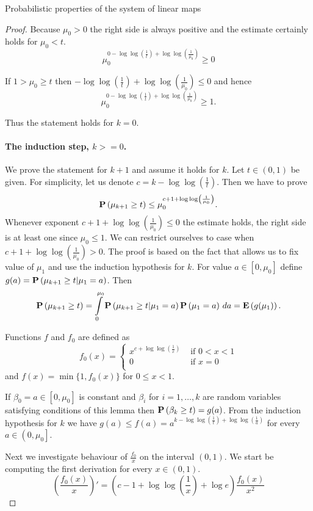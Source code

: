 \begin{section}{Probabilistic properties of the system of linear maps}
\begin{proof}
Because $\mu_0 > 0$ the right side is always positive and the estimate certainly holds for $\mu_0 < t$.
\[
	\mu_0^{0 - \log \log \left(\frac{1}{t}\right) + \log \log \left(\frac{1}{\mu_0}\right)} \geq 0
\]

If $1 > \mu_0 \geq t$ then $-\log \log \left(\frac{1}{t}\right) + \log \log \left(\frac{1}{\mu_0}\right) \leq 0$ and hence
\[
	\mu_0^{0 - \log \log \left(\frac{1}{t}\right) + \log \log \left(\frac{1}{\mu_0}\right)} \geq 1 \text{.}
\]

Thus the statement holds for $k = 0$.

\paragraph*{The induction step, $k >= 0$.} We prove the statement for $k + 1$ and assume it holds for $k$. Let $t \in (0, 1)$ be given. For simplicity, let us denote $c = k - \log \log \left(\frac{1}{t}\right)$. Then we have to prove
\[
	\mathbf{P}\left(\mu_{k + 1} \geq t\right) \leq \mu_0 ^ {c + 1 + \log \log \left(\frac{1}{\mu_0}\right)} \text{.}
\]
Whenever exponent $c + 1 + \log \log \left(\frac{1}{\mu_0}\right) \leq 0$ the estimate holds, the right side is at least one since $\mu_0 \leq 1$. We can restrict ourselves to case when $c + 1 + \log \log \left(\frac{1}{\mu_0}\right) > 0$. The proof is based on the fact that allows us to fix value of $\mu_1$ and use the induction hypothesis for $k$. For value $a \in \left[0, \mu_0\right]$ define $g(a) = \mathbf{P}\left(\mu_{k + 1} \geq t | \mu_1 = a\right)$. Then
\[
	\mathbf{P}\left(\mu_{k + 1} \geq t\right) = \int\limits_{0}^{\mu_0}\mathbf{P}\left(\mu_{k + 1} \geq t | \mu_1 = a\right)\mathbf{P}\left(\mu_1 = a\right) \, da = \mathbf{E}\left(g(\mu_1)\right) \text{.}
\]

Functions $f$ and $f_0$ are defined as
\[ 
	f_0(x) = \begin{cases}
		x ^ {c + \log \log \left(\frac{1}{x}\right)} & \text{ if } 0 < x < 1 \\ 
		0 & \text{ if } x = 0 \\
	\end{cases}
\]
and $f(x) = \min \{1, f_0(x) \}$ for $0 \leq x < 1$.

If $\beta_0 = a \in \left[0, \mu_0 \right]$ is constant and $\beta_i$ for $i = 1, \dots, k$ are random variables satisfying conditions of this lemma then $\mathbf{P}\left(\beta_k \geq t\right) = g(a)$. From the induction hypothesis for $k$ we have $g(a) \leq f(a) = a^{k - \log \log \left(\frac{1}{t}\right) + \log \log \left(\frac{1}{a}\right)}$ for every $a \in \left(0, \mu_0 \right]$.

Next we investigate behaviour of $\frac{f_0}{x}$ on the interval $(0, 1)$. We start be computing the first derivation for every $x \in (0, 1)$.
\[
\left(\frac{f_0(x)}{x}\right)' = (c - 1 + \log \log \left( \frac{1}{x} \right) + \log e)\frac{f_0(x)}{x^2}
\]


\end{proof}
\end{section}
